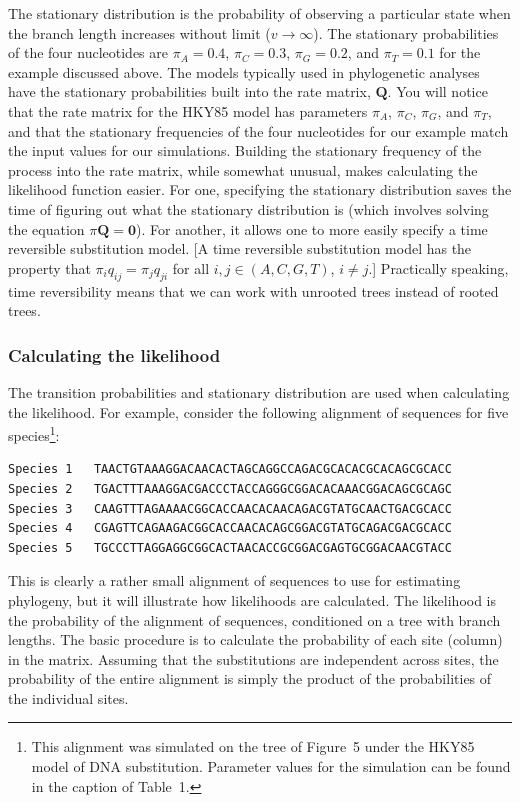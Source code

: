 \documentclass{svmult}
\begin{document}
The stationary distribution is the probability of observing a particular state when the branch length increases without limit
($v \rightarrow \infty$). The stationary probabilities of the four nucleotides are $\pi_A = 0.4$, $\pi_C = 0.3$, $\pi_G = 0.2$,
and $\pi_T = 0.1$ for the example discussed above. The models typically used in phylogenetic analyses have the stationary
probabilities built into the rate matrix, ${\mathbf Q}$. You will notice that the rate matrix for the HKY85
model has parameters $\pi_A$, $\pi_C$, $\pi_G$, and $\pi_T$, and that the stationary frequencies of the four nucleotides
for our example match the input values for our simulations. Building the stationary frequency of the process into the
rate matrix, while somewhat unusual, makes calculating the likelihood function easier. For one, specifying the stationary
distribution saves the time of figuring out what the stationary distribution is (which involves solving the equation
$\pi {\mathbf Q} = {\mathbf 0}$). For another, it allows one to more easily specify  a time reversible substitution model.
[A time reversible substitution model has the property that $\pi_i q_{ij} = \pi_j q_{ji}$ for all $i, j \in (A,C,G,T)$, $i \neq j$.]
Practically speaking, time reversibility means that we can work with unrooted trees instead of rooted trees.

\subsubsection{Calculating the likelihood} The transition probabilities and stationary distribution are used when calculating
the likelihood. For example, consider the following alignment of sequences for five species\footnote{This alignment was simulated on the tree of Figure~5 under the HKY85 model of DNA substitution. Parameter values for
the simulation can be found in the caption of Table~1.}:
\begin{verbatim}
Species 1   TAACTGTAAAGGACAACACTAGCAGGCCAGACGCACACGCACAGCGCACC
Species 2   TGACTTTAAAGGACGACCCTACCAGGGCGGACACAAACGGACAGCGCAGC
Species 3   CAAGTTTAGAAAACGGCACCAACACAACAGACGTATGCAACTGACGCACC
Species 4   CGAGTTCAGAAGACGGCACCAACACAGCGGACGTATGCAGACGACGCACC
Species 5   TGCCCTTAGGAGGCGGCACTAACACCGCGGACGAGTGCGGACAACGTACC

\end{verbatim}
This is clearly a rather small alignment of sequences to use for estimating phylogeny, but it will illustrate
how likelihoods are calculated. The likelihood is the probability of the alignment of sequences, conditioned on a tree
with branch lengths. The basic procedure is to calculate the probability of each site (column) in the matrix. Assuming that
the substitutions are independent across sites, the probability of the entire alignment is simply the product of the probabilities
of the individual sites. 
\end{document}
